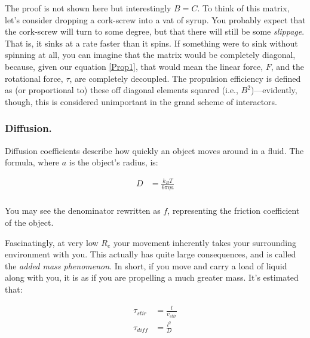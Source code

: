 The proof is not shown here but interestingly $B = C$. To think of this matrix, let's consider dropping a cork-screw into a vat of syrup. You probably expect that the cork-screw will turn to some degree, but that there will still be some \textit{slippage}. That is, it sinks at a rate faster than it spins. If something were to sink without spinning at all, you can imagine that the matrix would be completely diagonal, because, given our equation \ref{Prop1}, that would mean the linear force, $F$, and the rotational force, $\tau$, are completely decoupled. The propulsion efficiency is defined as (or proportional to) these off diagonal elements squared (i.e., $B^2$)---evidently, though, this is considered unimportant in the grand scheme of interactors. 

\subsubsection{Diffusion.}

Diffusion coefficients describe how quickly an object moves around in a fluid. The formula, where $a$ is the object's radius, is: 

\begin{equation} \label{diffdef}
\begin{split}
D &= \frac{k_BT}{6\pi\eta a} \\
\end{split}
\end{equation}

You may see the denominator rewritten as $f$, representing the friction coefficient of the object.\newline

Fascinatingly, at very low $R_e$ your movement inherently takes your surrounding environment with you. This actually has quite large consequences, and is called the \textit{added mass phenomenon}. In short, if you move and carry a load of liquid along with you, it is as if you are propelling a much greater mass. It's estimated that: 

\begin{equation} \label{diff01}
\begin{split}
\tau_{stir} &= \frac{l}{v_{stir}} \\
\tau_{diff} &= \frac{l^2}{D} \\
\end{split}
\end{equation}

